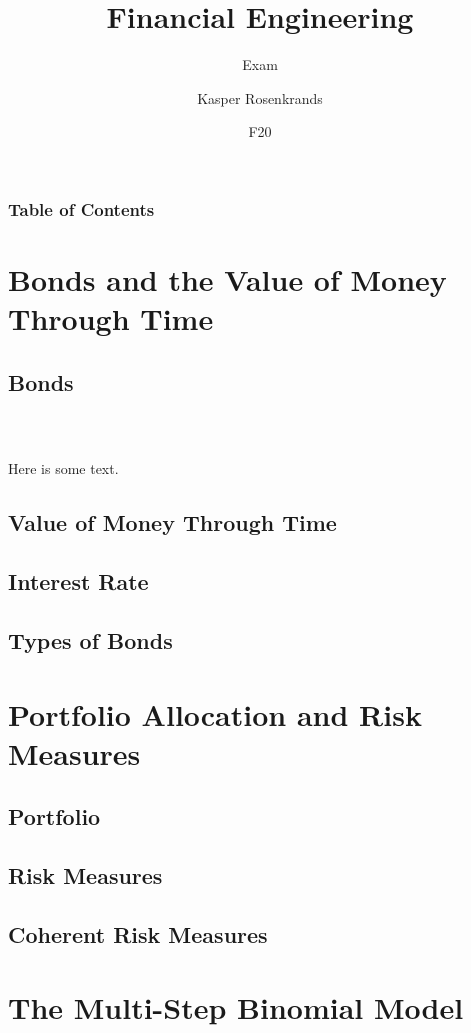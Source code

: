 \documentclass{beamer}
\title{Financial Engineering}
\subtitle{Exam}
\author{Kasper Rosenkrands}
\institute{Aalborg University}
\date{F20}
\begin{document}
\frame{\titlepage}

\begin{frame}
\frametitle{Table of Contents}
\tableofcontents[hideallsubsections]
\end{frame}

\section{Bonds and the Value of Money Through Time}
\subsection{Bonds}

\begin{frame}\frametitle{{\normalsize \secname} \\ {\normalsize \subsecname}}
    Here is some text.
\end{frame}

\subsection{Value of Money Through Time}
\subsection{Interest Rate}
\subsection{Types of Bonds}

\section{Portfolio Allocation and Risk Measures}
\subsection{Portfolio}
\subsection{Risk Measures}
\subsection{Coherent Risk Measures}

\section{The Multi-Step Binomial Model}
\end{document}
